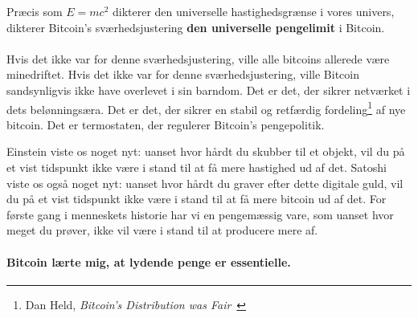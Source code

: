 Præcis som $E=mc^2$ dikterer den universelle hastighedsgrænse i vores univers,
dikterer Bitcoin's sværhedsjustering \textbf{den universelle pengelimit}
i Bitcoin.

\paragraph{}
Hvis det ikke var for denne sværhedsjustering, ville alle bitcoins allerede 
være minedriftet. Hvis det ikke var for denne sværhedsjustering, ville Bitcoin 
sandsynligvis ikke have overlevet i sin barndom. Det er det, der sikrer 
netværket i dets belønningsæra. Det er det, der sikrer en stabil og retfærdig 
fordeling\footnote{Dan Held, 
\textit{Bitcoin's Distribution was Fair}~\cite{distribution-was-fair}} af nye
bitcoin. Det er termostaten, der regulerer Bitcoin's pengepolitik.

Einstein viste os noget nyt: uanset hvor hårdt du skubber til et
objekt, vil du på et vist tidspunkt ikke være i stand til at få mere 
hastighed ud af det. Satoshi viste os også noget nyt: uanset hvor hårdt du 
graver efter dette digitale guld, vil du på et vist tidspunkt ikke være i stand 
til at få mere bitcoin ud af det. For første gang i menneskets historie har vi 
en pengemæssig vare, som uanset hvor meget du prøver, ikke vil være i stand til
at producere mere af.

\paragraph{Bitcoin lærte mig, at lydende penge er essentielle.}

%
%
%
%
%
%
%
%
